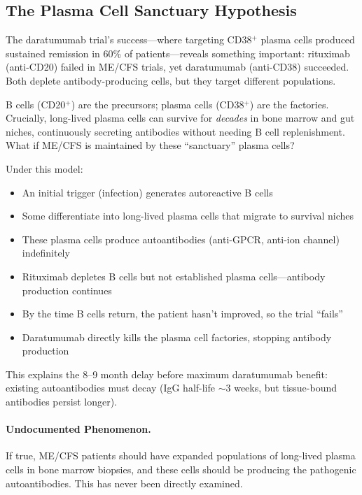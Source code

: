 \subsection{The Plasma Cell Sanctuary Hypothesis}

\begin{open_question}
The daratumumab trial's success---where targeting CD38$^+$ plasma cells produced sustained remission in 60\% of patients---reveals something important: rituximab (anti-CD20) failed in ME/CFS trials, yet daratumumab (anti-CD38) succeeded. Both deplete antibody-producing cells, but they target different populations.

B cells (CD20$^+$) are the precursors; plasma cells (CD38$^+$) are the factories. Crucially, long-lived plasma cells can survive for \textit{decades} in bone marrow and gut niches, continuously secreting antibodies without needing B cell replenishment. What if ME/CFS is maintained by these ``sanctuary'' plasma cells?

Under this model:
\begin{itemize}
    \item An initial trigger (infection) generates autoreactive B cells
    \item Some differentiate into long-lived plasma cells that migrate to survival niches
    \item These plasma cells produce autoantibodies (anti-GPCR, anti-ion channel) indefinitely
    \item Rituximab depletes B cells but not established plasma cells---antibody production continues
    \item By the time B cells return, the patient hasn't improved, so the trial ``fails''
    \item Daratumumab directly kills the plasma cell factories, stopping antibody production
\end{itemize}

This explains the 8--9 month delay before maximum daratumumab benefit: existing autoantibodies must decay (IgG half-life $\sim$3 weeks, but tissue-bound antibodies persist longer).
\end{open_question}

\paragraph{Undocumented Phenomenon.} If true, ME/CFS patients should have expanded populations of long-lived plasma cells in bone marrow biopsies, and these cells should be producing the pathogenic autoantibodies. This has never been directly examined.

